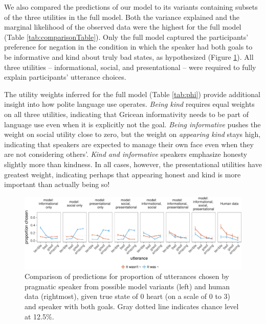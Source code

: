 \documentclass[12pt]{article}
\begin{document}
We also compared the predictions of our model to its variants containing subsets of the three utilities in the full model. Both the variance explained and the marginal likelihood of the observed data were the highest for the full model (Table \ref{tab:comparisonTable}).
Only the full model captured the participants' preference for negation in the condition in which the speaker had both goals to be informative and kind about truly bad states, as hypothesized (Figure \ref{fig:comparison}). All three utilities -- informational, social, and presentational -- were required to fully explain participants' utterance choices.

The utility weights inferred for the full model (Table  \ref{tab:phi}) provide additional insight into how polite language use operates. 
\emph{Being kind} requires equal weights on all three utilities, indicating that Gricean informativity needs to be part of language use even when it is explicitly not the goal. 
\emph{Being informative} pushes the weight on social utility close to zero, but the weight on \emph{appearing kind} stays high, indicating that speakers are expected to manage their own face even when they are not considering others'. 
\emph{Kind and informative} speakers emphasize honesty slightly more than kindness. 
In all cases, however, the presentational utilities have greatest weight, indicating perhaps that appearing honest and kind is more important than actually being so!

\begin{figure}
\centering
\includegraphics[width=\textwidth]{polite_manuscript_files/figure-latex/comparison-1.pdf}
\caption{\label{fig:comparison}Comparison of predictions for proportion of
utterances chosen by pragmatic speaker from possible model variants
(left) and human data (rightmost), given true state of 0 heart (on a scale
of 0 to 3) and speaker with both goals. Gray dotted line indicates
chance level at 12.5\%.}
\end{figure}
\end{document}
